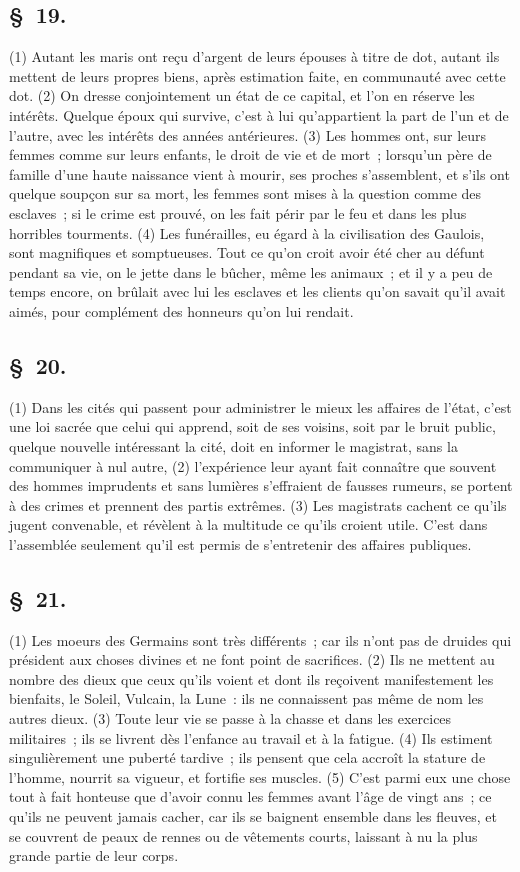 \documentclass[french,twoside]{book} %
\begin{document}
\subsection[{§ 19.}]{ \textsc{§ 19.} }
\noindent (1) Autant les maris ont reçu d’argent de leurs épouses à titre de dot, autant ils mettent de leurs propres biens, après estimation faite, en communauté avec cette dot. (2) On dresse conjointement un état de ce capital, et l’on en réserve les intérêts. Quelque époux qui survive, c’est à lui qu’appartient la part de l’un et de l’autre, avec les intérêts des années antérieures. (3) Les hommes ont, sur leurs femmes comme sur leurs enfants, le droit de vie et de mort ; lorsqu’un père de famille d’une haute naissance vient à mourir, ses proches s’assemblent, et s’ils ont quelque soupçon sur sa mort, les femmes sont mises à la question comme des esclaves ; si le crime est prouvé, on les fait périr par le feu et dans les plus horribles tourments. (4) Les funérailles, eu égard à la civilisation des Gaulois, sont magnifiques et somptueuses. Tout ce qu’on croit avoir été cher au défunt pendant sa vie, on le jette dans le bûcher, même les animaux ; et il y a peu de temps encore, on brûlait avec lui les esclaves et les clients qu’on savait qu’il avait aimés, pour complément des honneurs qu’on lui rendait.
\subsection[{§ 20.}]{ \textsc{§ 20.} }
\noindent (1) Dans les cités qui passent pour administrer le mieux les affaires de l’état, c’est une loi sacrée que celui qui apprend, soit de ses voisins, soit par le bruit public, quelque nouvelle intéressant la cité, doit en informer le magistrat, sans la communiquer à nul autre, (2) l’expérience leur ayant fait connaître que souvent des hommes imprudents et sans lumières s’effraient de fausses rumeurs, se portent à des crimes et prennent des partis extrêmes. (3) Les magistrats cachent ce qu’ils jugent convenable, et révèlent à la multitude ce qu’ils croient utile. C'est dans l’assemblée seulement qu’il est permis de s’entretenir des affaires publiques.
\subsection[{§ 21.}]{ \textsc{§ 21.} }
\noindent (1) Les moeurs des Germains sont très différents ; car ils n’ont pas de druides qui président aux choses divines et ne font point de sacrifices. (2) Ils ne mettent au nombre des dieux que ceux qu’ils voient et dont ils reçoivent manifestement les bienfaits, le Soleil, Vulcain, la Lune : ils ne connaissent pas même de nom les autres dieux. (3) Toute leur vie se passe à la chasse et dans les exercices militaires ; ils se livrent dès l’enfance au travail et à la fatigue. (4) Ils estiment singulièrement une puberté tardive ; ils pensent que cela accroît la stature de l’homme, nourrit sa vigueur, et fortifie ses muscles. (5) C'est parmi eux une chose tout à fait honteuse que d’avoir connu les femmes avant l’âge de vingt ans ; ce qu’ils ne peuvent jamais cacher, car ils se baignent ensemble dans les fleuves, et se couvrent de peaux de rennes ou de vêtements courts, laissant à nu la plus grande partie de leur corps.
\end{document}
